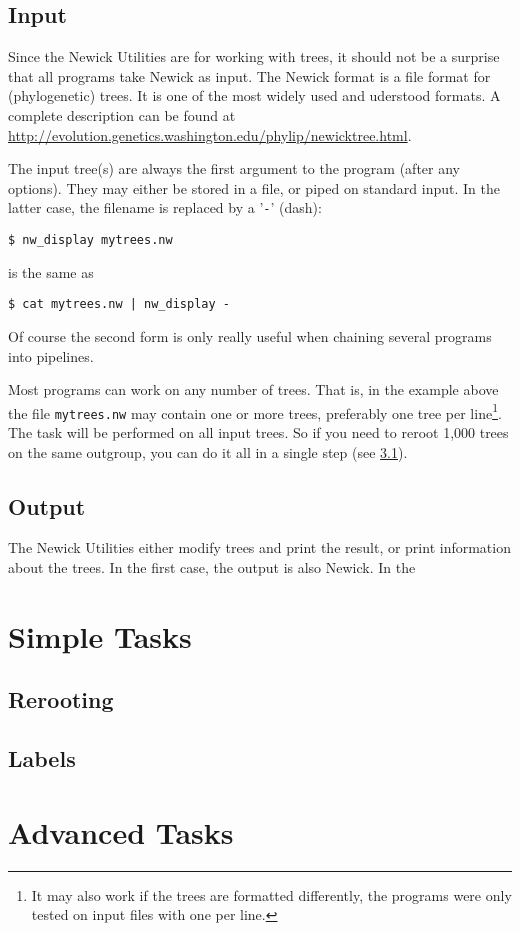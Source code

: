 \documentclass[a4paper,10pt]{report}
\newcommand{\nutils}{Newick Utilities}
\newcommand{\stdin}{standard input}
\begin{document}
\section{Input}
\label{sect_input}

Since the \nutils{} are for working with trees, it should not be a surprise that all programs take Newick as input. The Newick format is a file format for (phylogenetic) trees. It is one of the most widely used and uderstood formats.
A complete description can be found at \url{http://evolution.genetics.washington.edu/phylip/newicktree.html}.

The input tree(s) are always the first argument to the program (after any options). They may either be stored in a file, or piped on \stdin{}. In the latter case, the filename is replaced by a '\texttt{-}' (dash):

\begin{samepage}
\begin{verbatim}
$ nw_display mytrees.nw
\end{verbatim}
is the same as
\begin{verbatim}
$ cat mytrees.nw | nw_display -
\end{verbatim}
\end{samepage}
Of course the second form is only really useful when chaining several programs into pipelines.

Most programs can work on any number of trees. That is, in the example above the file \texttt{mytrees.nw} may contain one or more trees, preferably one tree per line\footnote{It may also work if the trees are formatted differently, the programs were only tested on input files with one per line.}. The task will be performed on all input trees. So if you need to reroot 1,000 trees on the same outgroup, you can do it all in a single step (see \ref{sct_reroot}).

\section{Output}
\label{sect_output}

The \nutils{} either modify trees and print the result, or print information about the trees. In the first case, the output is also Newick. In the 

\chapter{Simple Tasks}
\label{chap_simple}

\section{Rerooting}
\label{sct_reroot}

\section{Labels}

\chapter{Advanced Tasks}
\label{chap_adv}
\end{document}
